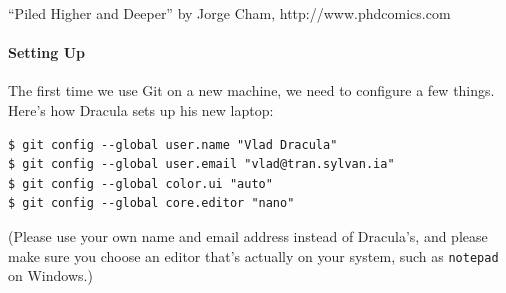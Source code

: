\documentclass{book}
\begin{document}

``Piled Higher and Deeper'' by Jorge Cham, http://www.phdcomics.com

\mbox{}\paragraph{Setting Up}

The first time we use Git on a new machine, we need to configure a few
things. Here's how Dracula sets up his new laptop:

\begin{verbatim}
$ git config --global user.name "Vlad Dracula"
$ git config --global user.email "vlad@tran.sylvan.ia"
$ git config --global color.ui "auto"
$ git config --global core.editor "nano"
\end{verbatim}

(Please use your own name and email address instead of Dracula's, and
please make sure you choose an editor that's actually on your system,
such as \texttt{notepad} on Windows.)
\end{document}
